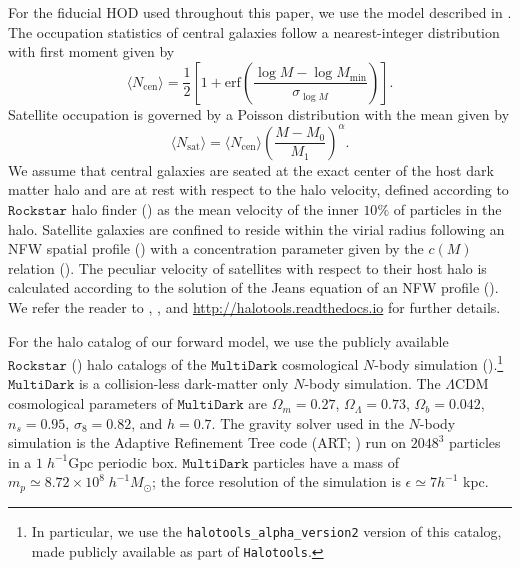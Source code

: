 \documentclass[fleqn,usenatbib]{mnras}
\begin{document}
For the fiducial HOD used throughout this paper, we use the model described in \citealt{zheng07}. 
The occupation statistics of central galaxies follow a nearest-integer distribution with first 
moment given by 
\begin{equation}
\label{eq:ncen}
\langle N_{\mathrm{cen}}\rangle = \frac{1}{2} \left[ 1 + \mathrm{erf}\left(\frac{\log M - \log M_{\mathrm{min}}}{\sigma_{\log M}}\right)\right].
\end{equation}
Satellite occupation is governed by a Poisson distribution with the mean given by 
\begin{equation}
\label{eq:nsat}
\langle N_{\mathrm{sat}}\rangle =  \langle N_{\mathrm{cen}} \rangle \left(\frac{M-M_{0}}{M_1}\right)^{\alpha}.
\end{equation}
We assume that central galaxies are seated at the exact center of the host dark matter halo and 
are at rest with respect to the halo velocity, defined according to $\mathtt{Rockstar}$ halo finder (\cite{rockstar})
as the mean velocity of the inner $10\%$ of particles in the halo. Satellite galaxies are confined to 
reside within the virial radius following an NFW spatial profile (\citealt{nfw}) with a concentration 
parameter given by the $c(M)$ relation (\citealt{nfw_c(M)}). The peculiar velocity of satellites with 
respect to their host halo is calculated according to the solution of the Jeans equation of an NFW 
profile (\citealt{more2010}). We refer the reader to \cite{hearin15}, 
\cite{Hearin:2016aa}, and \url{http://halotools.readthedocs.io}
for further details.  

For the halo catalog of our forward model, we use the publicly available $\mathtt{Rockstar}$ 
(\citealt{rockstar}) halo catalogs of the $\mathtt{MultiDark}$ cosmological $N$-body simulation 
(\citealt{multidark}).\footnote{In particular, we use the {\tt halotools\_alpha\_version2} version of this catalog, made publicly available as part of {\tt Halotools}.} $\mathtt{MultiDark}$ is a collision-less dark-matter only $N$-body simulation. 
The $\Lambda$CDM cosmological parameters of $\mathtt{MultiDark}$ are $\Omega_m = 0.27$, $\Omega_{\Lambda}=0.73$,
$\Omega_{b}=0.042$, $n_{s}=0.95$, $\sigma_{8} = 0.82$, and $h = 0.7$. The gravity solver used in the 
$N$-body simulation is the Adaptive Refinement Tree code (ART; \citealt{art}) run on $2048^3$ particles in a
$1\; h^{-1}\mathrm{Gpc}$ periodic box. $\mathtt{MultiDark}$ particles have a mass of $m_{p} \simeq 8.72 \times 
10^{8} \; h^{-1}M_{\odot}$; the force resolution of the simulation is $\epsilon \simeq 7 h^{-1}$ kpc.
\end{document}
